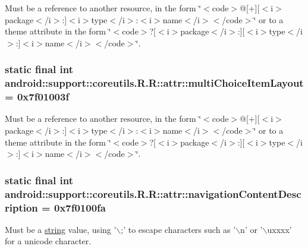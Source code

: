 Must be a reference to another resource, in the form \char`\"{}$<$code$>$@\mbox{[}+\mbox{]}\mbox{[}$<$i$>$package$<$/i$>$:\mbox{]}$<$i$>$type$<$/i$>$:$<$i$>$name$<$/i$>$$<$/code$>$\char`\"{} or to a theme attribute in the form \char`\"{}$<$code$>$?\mbox{[}$<$i$>$package$<$/i$>$:\mbox{]}\mbox{[}$<$i$>$type$<$/i$>$:\mbox{]}$<$i$>$name$<$/i$>$$<$/code$>$\char`\"{}. \hypertarget{classandroid_1_1support_1_1coreutils_1_1_r_1_1attr_ddf19eb488da420a96031e2b56589e73}{
\subsubsection[{multiChoiceItemLayout}]{\setlength{\rightskip}{0pt plus 5cm}static final int android::support::coreutils.R.R::attr::multiChoiceItemLayout = 0x7f01003f}}
\label{classandroid_1_1support_1_1coreutils_1_1_r_1_1attr_ddf19eb488da420a96031e2b56589e73}


Must be a reference to another resource, in the form \char`\"{}$<$code$>$@\mbox{[}+\mbox{]}\mbox{[}$<$i$>$package$<$/i$>$:\mbox{]}$<$i$>$type$<$/i$>$:$<$i$>$name$<$/i$>$$<$/code$>$\char`\"{} or to a theme attribute in the form \char`\"{}$<$code$>$?\mbox{[}$<$i$>$package$<$/i$>$:\mbox{]}\mbox{[}$<$i$>$type$<$/i$>$:\mbox{]}$<$i$>$name$<$/i$>$$<$/code$>$\char`\"{}. \hypertarget{classandroid_1_1support_1_1coreutils_1_1_r_1_1attr_e5c595e09fc4228a0c1e8299cf989d32}{
\subsubsection[{navigationContentDescription}]{\setlength{\rightskip}{0pt plus 5cm}static final int android::support::coreutils.R.R::attr::navigationContentDescription = 0x7f0100fa}}
\label{classandroid_1_1support_1_1coreutils_1_1_r_1_1attr_e5c595e09fc4228a0c1e8299cf989d32}


Must be a \hyperlink{classandroid_1_1support_1_1coreutils_1_1_r_1_1string}{string} value, using '$\backslash$;' to escape characters such as '$\backslash$n' or '$\backslash$uxxxx' for a unicode character. 

